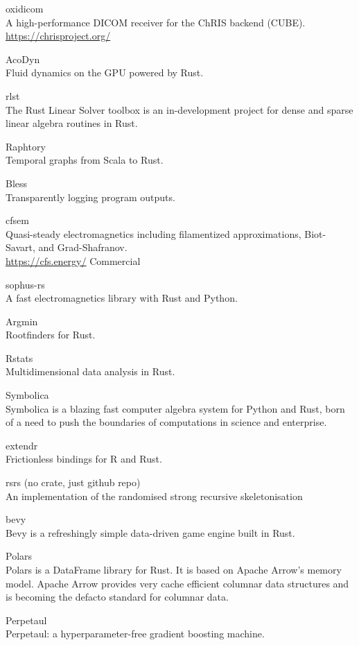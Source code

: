 \documentclass{article}
\begin{document}
oxidicom\\
A high-performance DICOM receiver for the ChRIS backend (CUBE).
\url{https://chrisproject.org/}

AcoDyn\\
Fluid dynamics on the GPU powered by Rust.

rlst\\
The Rust Linear Solver toolbox is an in-development project for dense and sparse linear
algebra routines in Rust.

Raphtory\\
Temporal graphs from Scala to Rust.

Bless\\
Transparently logging program outputs.

cfsem\\
Quasi-steady electromagnetics including filamentized approximations, Biot-Savart, and
Grad-Shafranov.\\
\url{https://cfs.energy/} Commercial

sophus-rs\\
A fast electromagnetics library with Rust and Python.

Argmin\\
Rootfinders for Rust.

Rstats\\
Multidimensional data analysis in Rust.

Symbolica\\
Symbolica is a blazing fast computer algebra system for Python and Rust, born of a need
to push the boundaries of computations in science and enterprise.

extendr\\
Frictionless bindings for R and Rust.

rsrs (no crate, just github repo)\\
An implementation of the randomised strong recursive
skeletonisation

bevy\\
Bevy is a refreshingly simple data-driven game engine built in Rust.

Polars\\
Polars is a DataFrame library for Rust. It is based on Apache Arrow’s memory model. Apache
Arrow provides very cache efficient columnar data structures and is becoming the defacto standard
for columnar data.

Perpetaul\\
Perpetaul: a hyperparameter-free gradient boosting machine.
\end{document}

